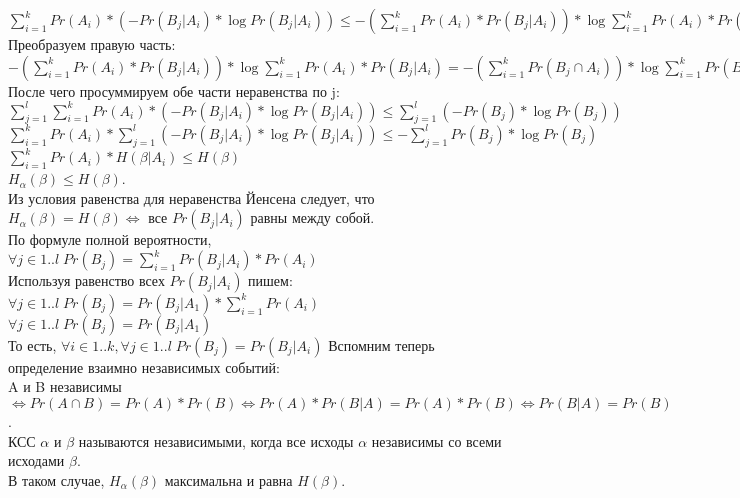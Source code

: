 $\sum\limits_{i = 1}^k Pr(A_i) * (- Pr(B_j | A_i) * \log Pr(B_j | A_i)) \leq -(\sum\limits_{i = 1}^k Pr(A_i) * Pr(B_j | A_i)) * \log \sum\limits_{i = 1}^k Pr(A_i) * Pr(B_j | A_i)$\\
Преобразуем правую часть:\\
$-(\sum\limits_{i = 1}^k Pr(A_i) * Pr(B_j | A_i)) * \log \sum\limits_{i = 1}^k Pr(A_i) * Pr(B_j | A_i) = -(\sum\limits_{i = 1}^k Pr(B_j \cap A_i)) * \log \sum\limits_{i = 1}^k Pr(B_j \cap A_i) = -Pr(B_j) * \log Pr(B_j)$\\
После чего просуммируем обе части неравенства по j:\\
$\sum_{j = 1}^l \sum\limits_{i = 1}^k Pr(A_i) * (- Pr(B_j | A_i) * \log Pr(B_j | A_i)) \leq \sum_{j = 1}^l (-Pr(B_j) * \log Pr(B_j))$\\
$\sum\limits_{i = 1}^k Pr(A_i) * \sum_{j = 1}^l (- Pr(B_j | A_i) * \log Pr(B_j | A_i)) \leq -\sum_{j = 1}^l Pr(B_j) * \log Pr(B_j)$\\
$\sum\limits_{i = 1}^k Pr(A_i) * H(\beta | A_i) \leq H(\beta)$\\
$H_{\alpha}(\beta) \leq H(\beta)$.\\
Из условия равенства для неравенства Йенсена следует, что $H_{\alpha}(\beta) = H(\beta) \Leftrightarrow$ все $Pr(B_j | A_i)$ равны между собой.\\
По формуле полной вероятности,\\
$\forall j \in 1..l \; Pr(B_j) = \sum\limits_{i = 1}^k Pr(B_j | A_i) * Pr(A_i)$\\
Используя равенство всех $Pr(B_j | A_i)$ пишем:\\
$\forall j \in 1..l \; Pr(B_j) = Pr(B_j | A_1) * \sum\limits_{i = 1}^k Pr(A_i)$\\
$\forall j \in 1..l \; Pr(B_j) = Pr(B_j | A_1)$\\
То есть, $\forall i \in 1..k, \forall j \in 1..l \; Pr(B_j) = Pr(B_j | A_i)$
Вспомним теперь определение взаимно независимых событий:\\
A и B независимы $\Leftrightarrow Pr(A \cap B) = Pr(A) * Pr(B) \Leftrightarrow Pr(A) * Pr(B | A) = Pr(A) * Pr(B) \Leftrightarrow Pr(B | A) = Pr(B)$.\\
КСС $\alpha$ и $\beta$ называются независимыми, когда все исходы $\alpha$ независимы со всеми исходами $\beta$.\\
В таком случае, $H_{\alpha}(\beta)$ максимальна и равна $H(\beta)$.
